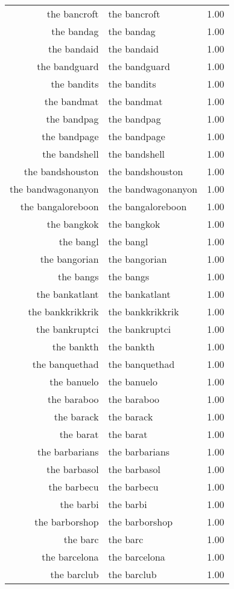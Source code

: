 \begin{table}[ht]
\begin{tabular}{rlr}
  the bancroft & the bancroft & 1.00 \\ 
  the bandag & the bandag & 1.00 \\ 
  the bandaid & the bandaid & 1.00 \\ 
  the bandguard & the bandguard & 1.00 \\ 
  the bandits & the bandits & 1.00 \\ 
  the bandmat & the bandmat & 1.00 \\ 
  the bandpag & the bandpag & 1.00 \\ 
  the bandpage & the bandpage & 1.00 \\ 
  the bandshell & the bandshell & 1.00 \\ 
  the bandshouston & the bandshouston & 1.00 \\ 
  the bandwagonanyon & the bandwagonanyon & 1.00 \\ 
  the bangaloreboon & the bangaloreboon & 1.00 \\ 
  the bangkok & the bangkok & 1.00 \\ 
  the bangl & the bangl & 1.00 \\ 
  the bangorian & the bangorian & 1.00 \\ 
  the bangs & the bangs & 1.00 \\ 
  the bankatlant & the bankatlant & 1.00 \\ 
  the bankkrikkrik & the bankkrikkrik & 1.00 \\ 
  the bankruptci & the bankruptci & 1.00 \\ 
  the bankth & the bankth & 1.00 \\ 
  the banquethad & the banquethad & 1.00 \\ 
  the banuelo & the banuelo & 1.00 \\ 
  the baraboo & the baraboo & 1.00 \\ 
  the barack & the barack & 1.00 \\ 
  the barat & the barat & 1.00 \\ 
  the barbarians & the barbarians & 1.00 \\ 
  the barbasol & the barbasol & 1.00 \\ 
  the barbecu & the barbecu & 1.00 \\ 
  the barbi & the barbi & 1.00 \\ 
  the barborshop & the barborshop & 1.00 \\ 
  the barc & the barc & 1.00 \\ 
  the barcelona & the barcelona & 1.00 \\ 
  the barclub & the barclub & 1.00 \\ 

\end{tabular}
\end{table}
